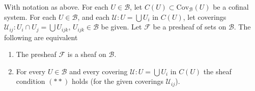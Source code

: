 \begin{lemma}
\label{lemma-cofinal-systems-coverings}
With notation as above.
For each $U \in \mathcal{B}$, let $C(U) \subset \text{Cov}_{\mathcal{B}}(U)$
be a cofinal system. For each $U \in \mathcal{B}$, and each
$\mathcal{U} : U = \bigcup U_i$ in $C(U)$, let coverings
$\mathcal{U}_{ij} : U_i \cap U_j = \bigcup U_{ijk}$,
$U_{ijk} \in \mathcal{B}$ be given.
Let $\mathcal{F}$ be a presheaf of sets on $\mathcal{B}$.
The following are equivalent
\begin{enumerate}
\item The presheaf $\mathcal{F}$ is a sheaf on $\mathcal{B}$.
\item For every $U \in \mathcal{B}$ and every covering
$\mathcal{U} : U = \bigcup U_i$ in $C(U)$ the sheaf condition
$(**)$ holds (for the given coverings $\mathcal{U}_{ij}$).
\end{enumerate}
\end{lemma}

